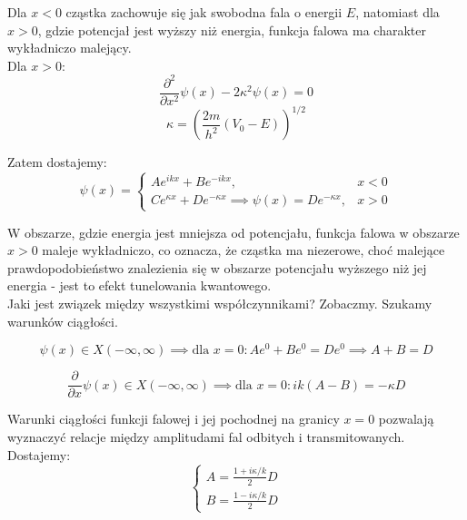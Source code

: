 Dla $x<0$ cząstka zachowuje się jak swobodna fala o energii $E$, natomiast dla $x>0$,
gdzie potencjał jest wyższy niż energia, funkcja falowa ma charakter wykładniczo malejący. \\

Dla $x > 0$:
\begin{equation*}
\frac{\partial^2}{\partial x^2} \psi(x) - 2 \kappa^2 \psi(x) = 0
\end{equation*}
%
\begin{equation*}
\kappa = \left( \frac{2m}{h^2} (V_0 - E) \right)^{1/2}
\end{equation*}




Zatem dostajemy:
\begin{equation*}
\psi(x) = 
\begin{cases}
    A e^{ikx} + B e^{-ikx}, & x < 0 \\
    C e^{\kappa x} + D e^{-\kappa x} \implies \psi(x) = D e^{-\kappa x}, & x > 0
\end{cases}
\end{equation*}

W obszarze, gdzie energia jest mniejsza od potencjału, funkcja falowa w obszarze $x>0$ maleje wykładniczo,
co oznacza, że cząstka ma niezerowe, choć malejące prawdopodobieństwo znalezienia się w obszarze potencjału
wyższego niż jej energia - jest to efekt tunelowania kwantowego. \\

Jaki jest związek między wszystkimi współczynnikami? Zobaczmy. Szukamy warunków ciągłości.

\begin{equation*}
\psi(x) \in X(-\infty, \infty) \implies \text{dla } x = 0: A e^0 + B e^0 = D e^0 \implies A + B = D
\end{equation*}

\begin{equation*}
\frac{\partial}{\partial x} \psi(x) \in X(-\infty, \infty) \implies \text{dla } x = 0: i k (A - B) = - \kappa D
\end{equation*}

Warunki ciągłości funkcji falowej i jej pochodnej na granicy $x=0$ pozwalają wyznaczyć relacje między amplitudami fal odbitych i transmitowanych. \\

Dostajemy:
\begin{equation*}
\begin{cases}
    A = \frac{1 + i \kappa / k}{2} D \\
    B = \frac{1 - i \kappa / k}{2} D
\end{cases}
\end{equation*}

